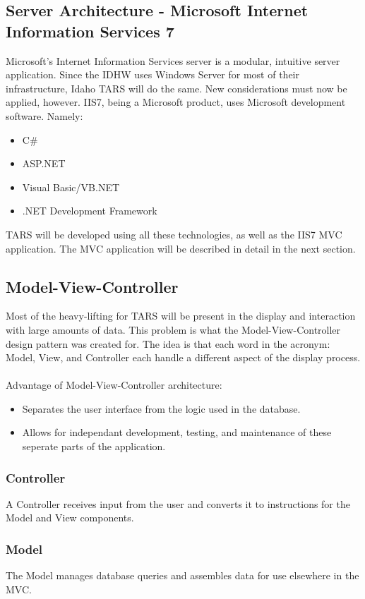 \documentclass[letterpaper]{article}
\begin{document}
\subsection{Server Architecture - Microsoft Internet Information Services 7} 
Microsoft's Internet Information Services server is a modular, intuitive server application. Since the IDHW uses Windows Server for most of their infrastructure, Idaho TARS will do the same. New considerations must now be applied, however. IIS7, being a Microsoft product, uses Microsoft development software. Namely:
\begin{itemize}
\item C\# 
\item ASP.NET
\item Visual Basic/VB.NET
\item .NET Development Framework
\end{itemize} 
TARS will be developed using all these technologies, as well as the IIS7 MVC application. The MVC application will be described in detail in the next section.

\subsection{Model-View-Controller}
Most of the heavy-lifting for TARS will be present in the display and interaction with large amounts of data. This problem is what the Model-View-Controller design pattern was created for. The idea is that each word in the acronym: Model, View, and Controller each handle a different aspect of the display process.\\
\\
Advantage of Model-View-Controller architecture:
\begin{itemize}
\item Separates the user interface from the logic used in the database.
\item Allows for independant development, testing, and maintenance of these seperate parts of the application.
\end{itemize}
\subsubsection{Controller}
A Controller receives input from the user and converts it to instructions for the Model and View components.
\subsubsection{Model}
The Model manages database queries and assembles data for use elsewhere in the MVC.
\end{document}
